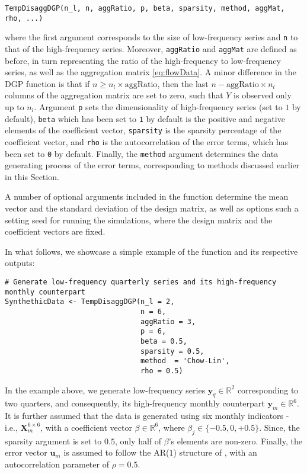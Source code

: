 \begin{verbatim}
TempDisaggDGP(n_l, n, aggRatio, p, beta, sparsity, method, aggMat, rho, ...)
\end{verbatim}

where the first argument corresponds to the size of low-frequency series and \texttt{n} to that of the high-frequency series. Moreover, \texttt{aggRatio} and \texttt{aggMat} are defined as before, in turn representing the ratio of the high-frequency to low-frequency series, as well as the aggregation matrix \eqref{eq:flowData}. A minor difference in the DGP function is that if \(n\geq n_l\times \text{aggRatio}\), then the last \(n-\text{aggRatio}\times n_l\) columns of the aggregation matrix are set to zero, such that \(Y\) is observed only up to \(n_l\). Argument \texttt{p} sets the dimensionality of high-frequency series (set to \(1\) by default), \texttt{beta} which has been set to \texttt{1} by default is the positive and negative elements of the coefficient vector, \texttt{sparsity} is the sparsity percentage of the coefficient vector, and
\texttt{rho} is the autocorrelation of the error terms, which has been set to \texttt{0} by default. Finally, the \texttt{method} argument determines the data generating process of the error terms, corresponding to methods discussed earlier in this Section.

A number of optional arguments included in the function determine the mean vector and the standard deviation of the design matrix, as well as options such a setting seed for running the simulations, where the design matrix and the coefficient vectors are fixed.

In what follows, we showcase a simple example of the function and its respective outputs:

\begin{verbatim}
# Generate low-frequency quarterly series and its high-frequency monthly counterpart
SynthethicData <- TempDisaggDGP(n_l = 2,
                                n = 6, 
                                aggRatio = 3, 
                                p = 6, 
                                beta = 0.5, 
                                sparsity = 0.5, 
                                method  = 'Chow-Lin', 
                                rho = 0.5)
\end{verbatim}

In the example above, we generate low-frequency series \(\mathbf{y}_q\in \mathbb{R}^2\) corresponding to two quarters, and consequently, its high-frequency monthly counterpart \(\mathbf{y}_m \in \mathbb{R}^{6}\). It is further assumed that the data is generated using six monthly indicators - i.e., \(\mathbf{X}^{6\times 6}_m\), with a coefficient vector \(\beta\in \mathbb{R}^6\), where \(\beta_j \in \{-0.5, 0, +0.5\}\). Since, the sparsity argument is set to \(0.5\), only half of \(\beta\)'s elements are non-zero. Finally, the error vector \(\mathbf{u}_m\) is assumed to follow the AR(\(1\)) structure of \citet{chow1971best}, with an autocorrelation parameter of \(\rho=0.5\).

